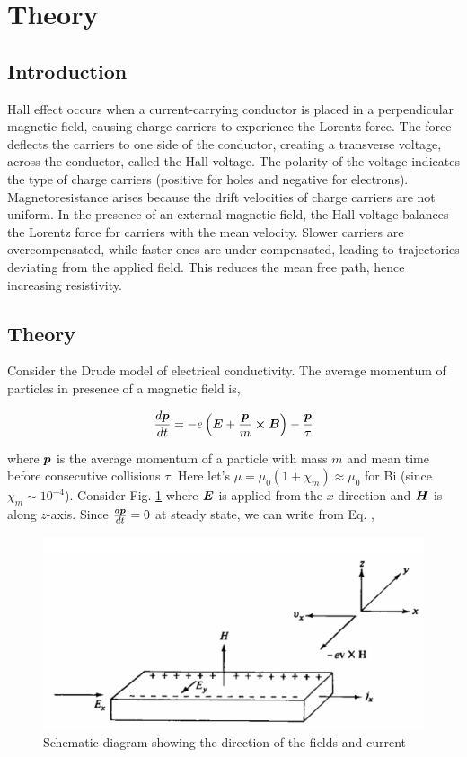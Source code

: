 \section{Theory}

\subsection{Introduction}

Hall effect occurs when a current-carrying conductor is placed in a perpendicular magnetic field, causing charge carriers to experience the Lorentz force.
The force deflects the carriers to one side of the conductor, creating a transverse voltage, across the conductor, called the Hall voltage. The polarity of the voltage indicates the type of charge carriers (positive for holes and
negative for electrons). 
Magnetoresistance arises because the drift
velocities of charge carriers are not uniform. In the presence of an external magnetic field, the Hall voltage balances the Lorentz force for carriers with the mean velocity. Slower carriers are overcompensated, while faster ones are under compensated, leading to trajectories deviating from the applied field.
This reduces the mean free path, hence increasing resistivity.

\subsection{Theory}
Consider the Drude model of electrical conductivity. The average momentum of particles in presence of a magnetic field is,

\begin{align} \label{eq1}
    \frac{d\boldsymbol{p}}{dt} = -e\left(\boldsymbol{E}+\frac{\boldsymbol{p}}{m}\cross\boldsymbol{B}\right)-\frac{\boldsymbol{p}}{\tau}
\end{align}

where $\boldsymbol{p}$ is the average momentum of a particle with mass $m$ and mean time before consecutive collisions $\tau$. Here let's $\mu = \mu_0(1+\chi_m)\approx\mu_0$ for Bi (since $\chi_m \sim 10^{-4}$). Consider Fig. \ref{1} where $\boldsymbol{E}$ is applied from the $x$-direction and $\boldsymbol{H}$ is along $z$-axis. Since $\frac{d\boldsymbol{p}}{dt}=0$ at steady state, we can write from Eq. \label{eq1},

\begin{figure}
    \centering
    \includegraphics[width=1\columnwidth]{images/d.png}
    \caption{Schematic diagram showing the direction of the fields and current}
    \label{1}
\end{figure}

